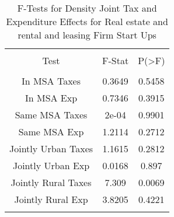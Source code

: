 
\begin{table}[!htbp] \centering 
  \caption{F-Tests for Density Joint Tax and Expenditure Effects for Real estate and rental and leasing Firm Start Ups} 
  \label{53Ftests} 
\begin{tabular}{@{\extracolsep{5pt}} ccc} 
\\[-1.8ex]\hline 
\hline \\[-1.8ex] 
Test & F-Stat & P(\textgreater F) \\ 
\hline \\[-1.8ex] 
In MSA Taxes & 0.3649 & 0.5458 \\ 
In MSA Exp & 0.7346 & 0.3915 \\ 
Same MSA Taxes & 2e-04 & 0.9901 \\ 
Same MSA Exp & 1.2114 & 0.2712 \\ 
Jointly Urban Taxes & 1.1615 & 0.2812 \\ 
Jointly Urban Exp & 0.0168 & 0.897 \\ 
Jointly Rural Taxes & 7.309 & 0.0069 \\ 
Jointly Rural Exp & 3.8205 & 0.4221 \\ 
\hline \\[-1.8ex] 
\end{tabular} 
\end{table} 
